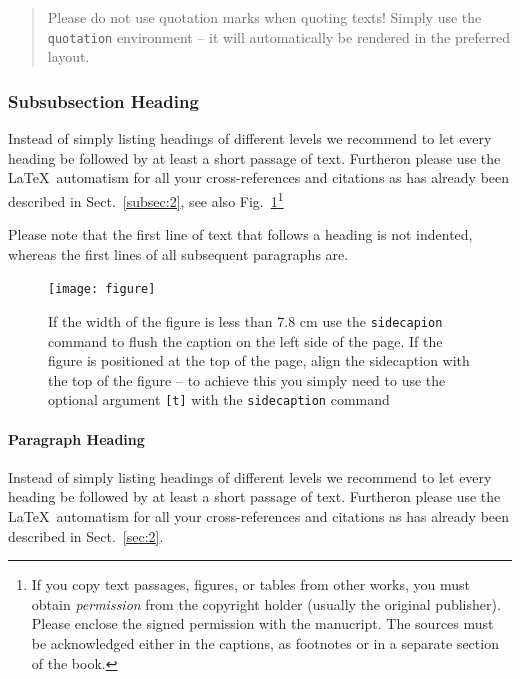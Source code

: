 \begin{quotation}
Please do not use quotation marks when quoting texts! Simply use the \verb|quotation| environment -- it will automatically be rendered in the preferred layout.
\end{quotation}


\subsubsection{Subsubsection Heading}
Instead of simply listing headings of different levels we recommend to let every heading be followed by at least a short passage of text. Furtheron please use the \LaTeX\ automatism for all your cross-references and citations as has already been described in Sect.~\ref{subsec:2}, see also Fig.~\ref{fig:1}\footnote{If you copy text passages, figures, or tables from other works, you must obtain \textit{permission} from the copyright holder (usually the original publisher). Please enclose the signed permission with the manucript. The sources must be acknowledged either in the captions, as footnotes or in a separate section of the book.}

Please note that the first line of text that follows a heading is not indented, whereas the first lines of all subsequent paragraphs are.

%
\begin{figure}[b]
\sidecaption
\texttt{[image: figure]}
%
%
\caption{If the width of the figure is less than 7.8 cm use the \texttt{sidecapion} command to flush the caption on the left side of the page. If the figure is positioned at the top of the page, align the sidecaption with the top of the figure -- to achieve this you simply need to use the optional argument \texttt{[t]} with the \texttt{sidecaption} command}
\label{fig:1}       %
\end{figure}


\paragraph{Paragraph Heading} %
Instead of simply listing headings of different levels we recommend to let every heading be followed by at least a short passage of text. Furtheron please use the \LaTeX\ automatism for all your cross-references and citations as has already been described in Sect.~\ref{sec:2}.

